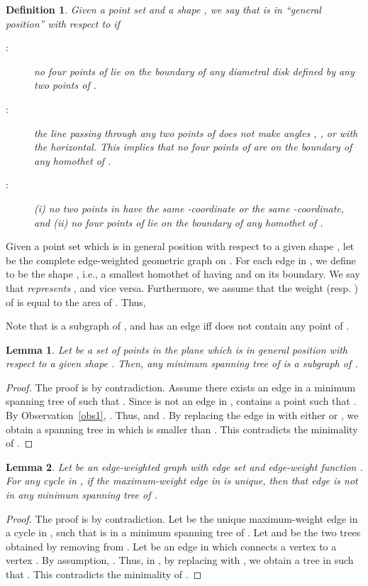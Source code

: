 \documentclass[11pt,a4paper]{article}
\newtheorem{lemma}{Lemma}
\newtheorem{definition}{Definition}
\begin{document}
\begin{definition}
 Given a point set  and a shape , we say that  is in ``general position'' with respect to  if
\begin{description}
 \item[:] no four points of  lie on the boundary of any diametral disk defined by any two points of .
 \item[:] the line passing through any two points of  does not make angles , , or  with the horizontal. This implies that no four points of  are on the boundary of any homothet of .
 \item[:] (i) no two points in  have the same -coordinate or the same -coordinate, and (ii) no four points of  lie on the boundary of any homothet of .
\end{description}
\end{definition}

Given a point set  which is in general position with respect to a given shape , let  be the complete edge-weighted geometric graph on . For each edge  in , we define  to be the shape , i.e., a smallest homothet of  having  and  on its boundary. We say that  {\em represents} , and vice versa. Furthermore, we assume that the weight  (resp. ) of  is equal to the area of . Thus,

Note that  is a subgraph of , and has an edge  iff  does not contain any point of . 


\begin{lemma}
\label{mst-in-GS}
Let  be a set of  points in the plane which is in general position with respect to a given shape . Then, any minimum spanning tree of  is a subgraph of . 
\end{lemma}
\begin{proof}
 The proof is by contradiction. Assume there exists an edge  in a minimum spanning tree  of  such that . Since  is not an edge in ,  contains a point  such that . By Observation~\ref{obs1}, . Thus,  and . By replacing the edge  in  with either  or , we obtain a spanning tree in  which is smaller than . This contradicts the minimality of .
\end{proof}

\begin{lemma}
\label{cycle-lemma}
Let  be an edge-weighted graph with edge set  and edge-weight function . For any cycle  in , if the maximum-weight edge in  is unique, then that edge is not in any minimum spanning tree of .
\end{lemma}

\begin{proof}
The proof is by contradiction. Let  be the unique maximum-weight edge in a cycle  in , such that  is in a minimum spanning tree  of . Let  and  be the two trees obtained by removing  from . Let  be an edge in  which connects a vertex  to a vertex . By assumption, . Thus, in , by replacing  with , we obtain a tree  in  such that . This contradicts the minimality of . 
\end{proof}
\end{document}
